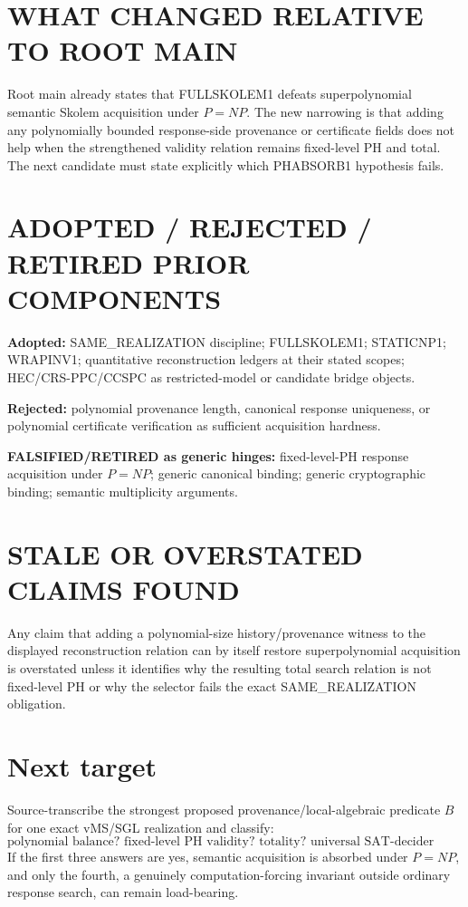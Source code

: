 \documentclass[11pt]{article}
\begin{document}
\section*{WHAT CHANGED RELATIVE TO ROOT MAIN}
Root main already states that FULLSKOLEM1 defeats superpolynomial semantic Skolem acquisition under \(P=NP\). The new narrowing is that adding any polynomially bounded response-side provenance or certificate fields does not help when the strengthened validity relation remains fixed-level PH and total. The next candidate must state explicitly which PHABSORB1 hypothesis fails.

\section*{ADOPTED / REJECTED / RETIRED PRIOR COMPONENTS}
\textbf{Adopted:} SAME\_REALIZATION discipline; FULLSKOLEM1; STATICNP1; WRAPINV1; quantitative reconstruction ledgers at their stated scopes; HEC/CRS-PPC/CCSPC as restricted-model or candidate bridge objects.

\textbf{Rejected:} polynomial provenance length, canonical response uniqueness, or polynomial certificate verification as sufficient acquisition hardness.

\textbf{FALSIFIED/RETIRED as generic hinges:} fixed-level-PH response acquisition under \(P=NP\); generic canonical binding; generic cryptographic binding; semantic multiplicity arguments.

\section*{STALE OR OVERSTATED CLAIMS FOUND}
Any claim that adding a polynomial-size history/provenance witness to the displayed reconstruction relation can by itself restore superpolynomial acquisition is overstated unless it identifies why the resulting total search relation is not fixed-level PH or why the selector fails the exact SAME\_REALIZATION obligation.

\section*{Next target}
Source-transcribe the strongest proposed provenance/local-algebraic predicate \(B\) for one exact vMS/SGL realization and classify:
\[
\boxed{\text{polynomial balance? fixed-level PH validity? totality? universal SAT-decider necessity?}}
\]
If the first three answers are yes, semantic acquisition is absorbed under \(P=NP\), and only the fourth, a genuinely computation-forcing invariant outside ordinary response search, can remain load-bearing.
\end{document}
